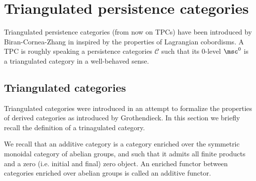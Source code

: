 
\section{Triangulated persistence categories}\label{se:TPC}

Triangulated persistence categories (from now on TPCs) have been introduced by Biran-Cornea-Zhang in \cite{BCZ:tpc} inspired by the properties of Lagrangian cobordisms. A TPC is roughly speaking a persistence categories $\mathcal{C}$ such that its $0$-level $\msc^0$ is a triangulated category in a well-behaved sense.

\subsection{Triangulated categories}\label{se:TC}
Triangulated categories were introduced in an attempt to formalize the properties of derived categories as introduced by Grothendieck. In this section we briefly recall the definition of a trinagulated category. 

We recall that an additive category is a category enriched over the symmetric monoidal category of abelian groups, and such that it admits all finite products and a zero (i.e. initial and final) zero object. An enriched functor between categories enriched over abelian groups is called an additive functor.

